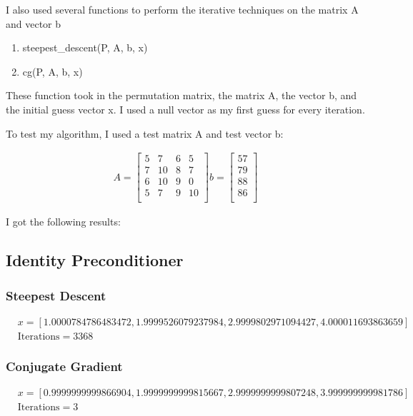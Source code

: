 \documentclass[12pt, letterpaper]{article}
\begin{document}
I also used several functions to perform the iterative techniques on the matrix A and vector b

\begin{enumerate}
   \item steepest\_descent(P, A, b, x)
   \item cg(P, A, b, x)
\end{enumerate}

These function took in the permutation matrix, the matrix A, the vector b, and the initial guess vector x. I used a null vector as my first guess for every iteration.

To test my algorithm, I used a test matrix A and test vector b:

\begin{align*}
      A = \begin{bmatrix}
          5 & 7 & 6 & 5 \\
          7 & 10 & 8 & 7 \\
          6 & 10 & 9 & 0 \\
          5 & 7 & 9 & 10 \\
      \end{bmatrix}
      b = \begin{bmatrix}
          57 \\
          79 \\
          88 \\
          86 \\
         \end{bmatrix}
\end{align*}


I got the following results:

\subsection*{Identity Preconditioner}

\subsubsection*{Steepest Descent}
\[
\begin{aligned}
    &x = [1.0000784786483472, 1.9999526079237984, 2.9999802971094427, 4.000011693863659] \\
    &\text{Iterations} = 3368
\end{aligned}
\]

\subsubsection*{Conjugate Gradient}
\[
\begin{aligned}
    &x = [0.9999999999866904, 1.9999999999815667, 2.9999999999807248, 3.999999999981786] \\
    &\text{Iterations} = 3
\end{aligned}
\]
\end{document}
